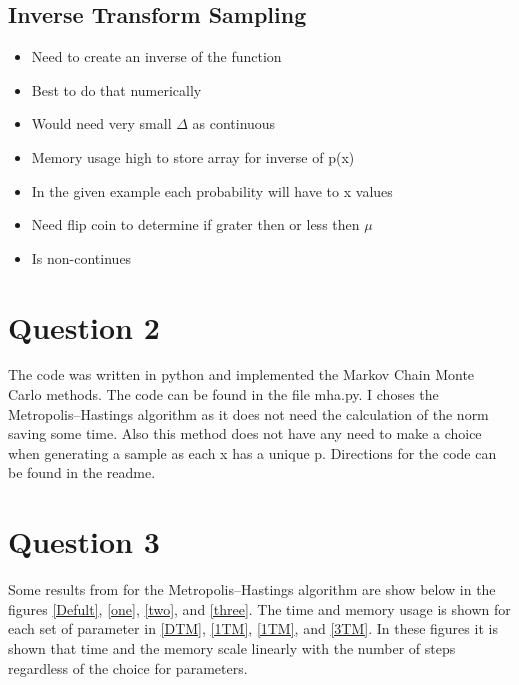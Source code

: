 \documentclass{article}
\begin{document}
\subsection{Inverse Transform Sampling}

\begin{itemize}
\itemsep-0.3cm 
\item Need to create an inverse of the function \\
\item Best to do that numerically \\
\item Would need very small $\Delta$ as continuous\\
\item Memory usage high to store array for inverse of p(x)\\
\item In the given example each probability will have to x values\\
\item Need flip coin to determine if grater then or less then $\mu$\\
\item Is non-continues \citep{ITPCDF}\citep{KKCDF}
\end{itemize}

\section{Question 2}

The code was written in python and implemented the Markov Chain Monte Carlo methods. The code can be found in the file mha.py. I choses the Metropolis–Hastings algorithm as it does not need the calculation of the norm saving some time. Also this method does not have any need to make a choice when generating a sample as each x has a unique p. Directions for the code can be found in the readme.

\section{Question 3}

Some results from for the Metropolis–Hastings algorithm are show below in the figures \ref{Defult}, \ref{one}, \ref{two}, and \ref{three}.  The time and memory usage is shown for each set of parameter in \ref{DTM}, \ref{1TM}, \ref{1TM}, and \ref{3TM}. In these figures it is shown that time and the memory scale linearly with the number of steps regardless of the choice for parameters. 
\end{document}
